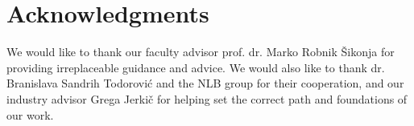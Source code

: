 \documentclass[fleqn,moreauthors,10pt]{ds_report}
\begin{document}
\section*{Acknowledgments}
We would like to thank our faculty advisor prof. dr. Marko Robnik Šikonja for providing irreplaceable guidance and advice. We would also like to thank dr. Branislava Sandrih Todorović and the NLB group for their cooperation, and our industry advisor Grega Jerkič for helping set the correct path and foundations of our work.



\clearpage


\end{document}
